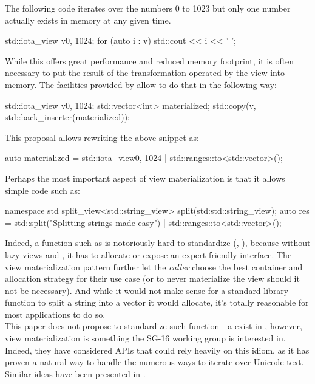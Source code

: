 \documentclass{wg21}
\begin{document}
The following code iterates over the numbers 0 to 1023 but only one number actually exists in memory at any given time.
\begin{colorblock}
std::iota_view v{0, 1024};
for (auto i : v) {
    std::cout << i << ' ';
}
\end{colorblock}

While this offers great performance and reduced memory footprint, it is often necessary to put the result of the transformation operated by the view into memory.
The facilities provided by \cite{P0896R3} allow to do that in the following way:


\begin{colorblock}
    std::iota_view v{0, 1024};
    std::vector<int> materialized;
    std::copy(v, std::back_inserter(materialized));
\end{colorblock}

This proposal allows rewriting the above snippet as:

\begin{colorblock}
    auto materialized = std::iota_view{0, 1024} | std::ranges::to<std::vector>();
\end{colorblock}


Perhaps the most important aspect of view materialization is that it allows simple code such as:

\begin{colorblock}
    namespace std {
        split_view<std::string_view> split(std:std::string_view);
    }
    auto res = std::split("Splitting strings made easy")
    	       | std::ranges::to<std::vector>();
\end{colorblock}

Indeed, a function such as  is notoriously hard to standardize (\cite{P0540},  \cite{N3593}), because without lazy views and , it has to allocate or expose an expert-friendly interface.
The view materialization pattern further let the \emph{caller} choose the best container and allocation strategy for their use case (or to never materialize the view should it not be necessary).
And while it would not make sense for a standard-library function to split a string into a vector it would allocate, it's totally reasonable for most applications to do so.\\

This paper does not propose to standardize such  function - a  exist in \cite{P0896R3}, however, view materialization is something the SG-16 working group is interested in.
Indeed, they have considered APIs that could rely heavily on this idiom, as it has proven a natural way to handle the numerous ways to iterate over Unicode text.
Similar ideas have been presented in \cite{P1004}.
\end{document}
